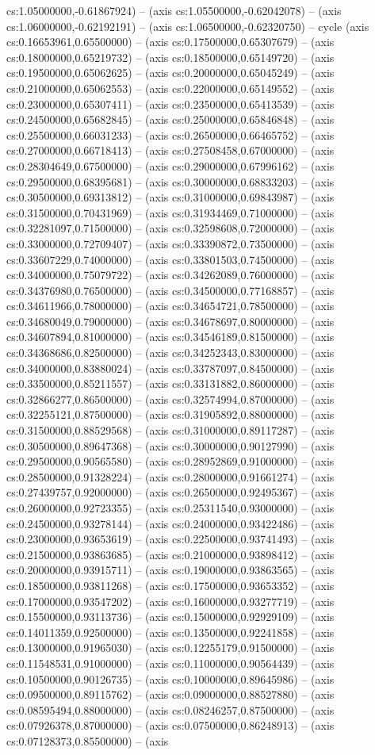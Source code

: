 cs:1.05000000,-0.61867924) -- (axis cs:1.05500000,-0.62042078) -- (axis cs:1.06000000,-0.62192191) -- (axis cs:1.06500000,-0.62320750) -- cycle (axis cs:0.16653961,0.65500000) -- (axis cs:0.17500000,0.65307679) -- (axis cs:0.18000000,0.65219732) -- (axis cs:0.18500000,0.65149720) -- (axis cs:0.19500000,0.65062625) -- (axis cs:0.20000000,0.65045249) -- (axis cs:0.21000000,0.65062553) -- (axis cs:0.22000000,0.65149552) -- (axis cs:0.23000000,0.65307411) -- (axis cs:0.23500000,0.65413539) -- (axis cs:0.24500000,0.65682845) -- (axis cs:0.25000000,0.65846848) -- (axis cs:0.25500000,0.66031233) -- (axis cs:0.26500000,0.66465752) -- (axis cs:0.27000000,0.66718413) -- (axis cs:0.27508458,0.67000000) -- (axis cs:0.28304649,0.67500000) -- (axis cs:0.29000000,0.67996162) -- (axis cs:0.29500000,0.68395681) -- (axis cs:0.30000000,0.68833203) -- (axis cs:0.30500000,0.69313812) -- (axis cs:0.31000000,0.69843987) -- (axis cs:0.31500000,0.70431969) -- (axis cs:0.31934469,0.71000000) -- (axis cs:0.32281097,0.71500000) -- (axis cs:0.32598608,0.72000000) -- (axis cs:0.33000000,0.72709407) -- (axis cs:0.33390872,0.73500000) -- (axis cs:0.33607229,0.74000000) -- (axis cs:0.33801503,0.74500000) -- (axis cs:0.34000000,0.75079722) -- (axis cs:0.34262089,0.76000000) -- (axis cs:0.34376980,0.76500000) -- (axis cs:0.34500000,0.77168857) -- (axis cs:0.34611966,0.78000000) -- (axis cs:0.34654721,0.78500000) -- (axis cs:0.34680049,0.79000000) -- (axis cs:0.34678697,0.80000000) -- (axis cs:0.34607894,0.81000000) -- (axis cs:0.34546189,0.81500000) -- (axis cs:0.34368686,0.82500000) -- (axis cs:0.34252343,0.83000000) -- (axis cs:0.34000000,0.83880024) -- (axis cs:0.33787097,0.84500000) -- (axis cs:0.33500000,0.85211557) -- (axis cs:0.33131882,0.86000000) -- (axis cs:0.32866277,0.86500000) -- (axis cs:0.32574994,0.87000000) -- (axis cs:0.32255121,0.87500000) -- (axis cs:0.31905892,0.88000000) -- (axis cs:0.31500000,0.88529568) -- (axis cs:0.31000000,0.89117287) -- (axis cs:0.30500000,0.89647368) -- (axis cs:0.30000000,0.90127990) -- (axis cs:0.29500000,0.90565580) -- (axis cs:0.28952869,0.91000000) -- (axis cs:0.28500000,0.91328224) -- (axis cs:0.28000000,0.91661274) -- (axis cs:0.27439757,0.92000000) -- (axis cs:0.26500000,0.92495367) -- (axis cs:0.26000000,0.92723355) -- (axis cs:0.25311540,0.93000000) -- (axis cs:0.24500000,0.93278144) -- (axis cs:0.24000000,0.93422486) -- (axis cs:0.23000000,0.93653619) -- (axis cs:0.22500000,0.93741493) -- (axis cs:0.21500000,0.93863685) -- (axis cs:0.21000000,0.93898412) -- (axis cs:0.20000000,0.93915711) -- (axis cs:0.19000000,0.93863565) -- (axis cs:0.18500000,0.93811268) -- (axis cs:0.17500000,0.93653352) -- (axis cs:0.17000000,0.93547202) -- (axis cs:0.16000000,0.93277719) -- (axis cs:0.15500000,0.93113736) -- (axis cs:0.15000000,0.92929109) -- (axis cs:0.14011359,0.92500000) -- (axis cs:0.13500000,0.92241858) -- (axis cs:0.13000000,0.91965030) -- (axis cs:0.12255179,0.91500000) -- (axis cs:0.11548531,0.91000000) -- (axis cs:0.11000000,0.90564439) -- (axis cs:0.10500000,0.90126735) -- (axis cs:0.10000000,0.89645986) -- (axis cs:0.09500000,0.89115762) -- (axis cs:0.09000000,0.88527880) -- (axis cs:0.08595494,0.88000000) -- (axis cs:0.08246257,0.87500000) -- (axis cs:0.07926378,0.87000000) -- (axis cs:0.07500000,0.86248913) -- (axis cs:0.07128373,0.85500000) -- (axis 